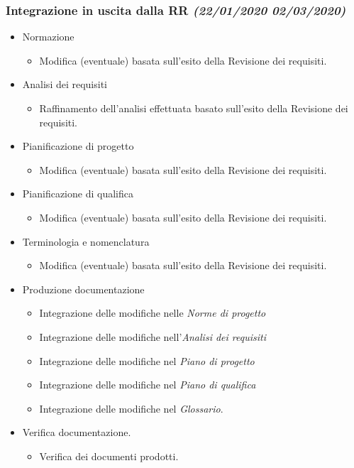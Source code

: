 \documentclass[../piano-di-progetto.tex]{subfiles}
\begin{document}
\subsubsection[Integrazione in uscita dalla RR]{Integrazione in uscita dalla RR {\normalsize\normalfont\itshape(22/01/2020  02/03/2020)}}%
\label{subs:integrazione_in_uscita_dalla_rr}
\begin{itemize}
  \item Normazione
  \begin{itemize}
    \item Modifica (eventuale) basata sull'esito della Revisione dei requisiti.
  \end{itemize}
  \item Analisi dei requisiti
  \begin{itemize}
    \item Raffinamento dell'analisi effettuata basato sull'esito della Revisione dei requisiti.
  \end{itemize}
  \item Pianificazione di progetto
  \begin{itemize}
    \item Modifica (eventuale) basata sull'esito della Revisione dei requisiti.
  \end{itemize}
  \item Pianificazione di qualifica
  \begin{itemize}
    \item Modifica (eventuale) basata sull'esito della Revisione dei requisiti.
  \end{itemize}
  \item Terminologia e nomenclatura
  \begin{itemize}
    \item Modifica (eventuale) basata sull'esito della Revisione dei requisiti.
  \end{itemize}
  \item Produzione documentazione
  \begin{itemize}
    \item Integrazione delle modifiche nelle \textit{Norme di progetto}
    \item Integrazione delle modifiche nell'\textit{Analisi dei requisiti}
    \item Integrazione delle modifiche nel \textit{Piano di progetto}
    \item Integrazione delle modifiche nel \textit{Piano di qualifica}
    \item Integrazione delle modifiche nel \textit{Glossario}.
  \end{itemize}
  \item Verifica documentazione.
  \begin{itemize}
    \item Verifica dei documenti prodotti.
  \end{itemize}
\end{itemize}
\end{document}

